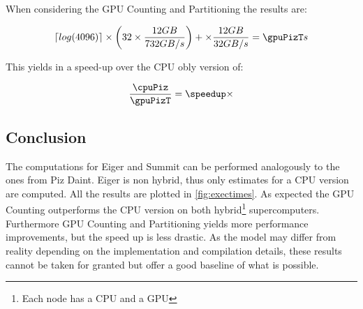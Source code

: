 \documentclass[]{article}
\begin{document}
When considering the GPU Counting and Partitioning the results are:
\pgfmathsetmacro{}
\begin{center}
	\begin{equation}
		\lceil log(4096) \rceil \times \left ( \p \times \frac{\s GB}{732 GB/s} \right ) + \times \frac{\s GB}{32 GB/s} = \gpuPizT s
	\end{equation}
\end{center}

This yields in a speed-up over the CPU obly version of:
\pgfmathsetmacro\speedup{\cpuPiz / \gpuPizT}
\begin{center}
	\begin{equation}
		\frac{\cpuPiz}{\gpuPizT} = \speedup \times
	\end{equation}
\end{center}

\vspace{5mm}

\pgfmathsetmacro{}
\pgfmathsetmacro{}
\pgfmathsetmacro{}
\pgfmathsetmacro{}


\subsection{Conclusion}

 
The computations for Eiger and Summit can be performed analogously to the ones from Piz Daint. Eiger is non hybrid, thus only estimates for a CPU version are computed. All the results are plotted in \ref{fig:exectimes}. As expected the GPU Counting outperforms the CPU version on both hybrid\footnote{Each node has a CPU and a GPU} supercomputers. Furthermore GPU Counting and Partitioning yields more performance improvements, but the speed up is less drastic. As the model may differ from reality depending on the implementation and compilation details, these results cannot be taken for granted but offer a good baseline of what is possible. 
\end{document}
